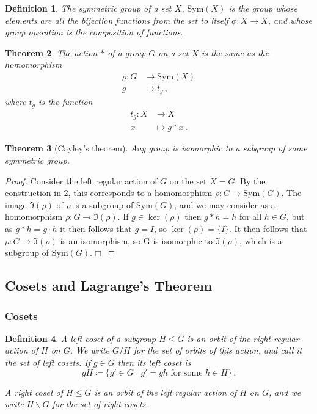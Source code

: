 \documentclass{article}
\theoremstyle{plain}\theoremheaderfont{\normalfont\itshape}\theorembodyfont{\rmfamily}\theoremseparator{.}\newtheorem*{rem}{Remark}\newtheorem*{ex}{Example}\newtheorem*{proof}{Proof}\newtheorem*{altp}{Alternative proof}
\theoremstyle{plain}\theoremheaderfont{\normalfont\bfseries}\theorembodyfont{\rmfamily}\theoremseparator{.}\newtheorem{thm}{Theorem}[section]\newtheorem{lem}[thm]{Lemma}\newtheorem{prop}[thm]{Proposition}\newtheorem*{cor}{Corollary}\newtheorem{defn}[thm]{Definition}\newtheorem{clm}[thm]{Claim}\newtheorem{clminproof}{Claim}
\theoremstyle{break}\theoremheaderfont{\normalfont\itshape}\theorembodyfont{\rmfamily}\theoremseparator{.\medskip}\newtheorem*{proofskip}{Proof}\newtheorem*{exs}{Examples}\newtheorem*{rems}{Remarks}
\theoremstyle{break}\theoremheaderfont{\normalfont\bfseries}\theorembodyfont{\rmfamily}\theoremseparator{.\medskip}\newtheorem{lemskip}[thm]{Lemma}\newtheorem{defnskip}[thm]{Definition}\newtheorem{propskip}[thm]{Proposition}\newtheorem{thmskip}[thm]{Theorem}
\numberwithin{equation}{section}
\newcommand{\qed}{\hfill\ensuremath{\Box}}
\begin{document}
	\begin{defn}
		The \textit{symmetric group} of a set \(X\), \(\mathrm{Sym}(X)\) is the group whose elements are all the bijection functions from the set to itself \(\phi: X\to X\), and whose group operation is the composition of functions.
	\end{defn}
	\begin{thm}\label{actionthm}
		The action \(*\) of a group \(G\) on a set \(X\) is the same as the homomorphism
		\begin{align*}
			\rho:G&\to\mathrm{Sym}(X)\\
			g&\mapsto t_g\,,
		\end{align*}
		where \(t_g\) is the function
		\begin{align*}
			t_g:X&\to X\\
			x&\mapsto g*x\,.
		\end{align*}
	\end{thm}
	\begin{thm}[Cayley's theorem]\label{caythm}
		Any group is isomorphic to a subgroup of some symmetric group.
	\end{thm}
	\begin{proof}
		Consider the left regular action of \(G\) on the set \(X=G\). By the construction in \cref{actionthm}, this corresponds to a homomorphism \(\rho:G\to\mathrm{Sym}(G)\). The image \(\Im(\rho)\) of \(\rho\) is a subgroup of \(\mathrm{Sym}(G)\), and we may consider as a homomorphism \(\rho:G\to\Im(\rho)\). If \(g\in\ker(\rho)\) then \(g*h=h\) for all \(h\in G\), but as \(g*h=g\cdot h\) it then follows that \(g = I\), so \(\ker(\rho)=\{I\}\). It then follows that \(\rho:G\to\Im(\rho)\) is an isomorphism, so G is isomorphic to \(\Im(\rho)\), which is a subgroup of \(\mathrm{Sym}(G)\).\qed
	\end{proof}
	
	\subsection{Cosets and Lagrange's Theorem}
	\subsubsection{Cosets}
	\begin{defn}
		A \textit{left coset} of a subgroup \(H\le G\) is an orbit of the right regular action of \(H\) on \(G\). We write \(G/ H\) for the set of orbits of this action, and call it \textit{the set of left cosets}. If \(g\in G\) then its left coset is
		\[gH\coloneqq\{g'\in G\mid g'=gh\text{ for some }h\in H\}\,.\]

		A \textit{right coset} of \(H\le G\) is an orbit of the left regular action of \(H\) on \(G\), and we write \(H\backslash G\) for \textit{the set of right cosets}.
	\end{defn}
	
\end{document}
